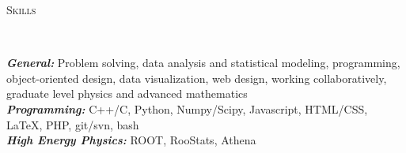 \documentclass[9pt]{article}
\newenvironment{changemargin}[2]{%
  \begin{list}{}{%
    \setlength{\topsep}{0pt}%
    \setlength{\leftmargin}{#1}%
    \setlength{\rightmargin}{#2}%
    \setlength{\listparindent}{\parindent}%
    \setlength{\itemindent}{\parindent}%
    \setlength{\parsep}{\parskip}%
  }%
  \item[]}{\end{list}
}
\newcommand{\lineover}{
	\begin{changemargin}{-0.05in}{-0.05in}
		\vspace*{-8pt}
		\hrulefill \\
		\vspace*{-2pt}
	\end{changemargin}
}
\newcommand{\header}[1]{
	\begin{changemargin}{-0.5in}{-0.5in}
		\scshape{#1}\\
  	\lineover
	\end{changemargin}
}
\newenvironment{body} {
	\vspace*{-16pt}
	\begin{changemargin}{-0.25in}{-0.5in}
  }	
	{\end{changemargin}
}
\begin{document}
\header{Skills}

\begin{body}
	\vspace{14pt}
        \emph{\textbf{General:}}{} Problem solving, data analysis and statistical modeling, programming, object-oriented design, data visualization, web design, working collaboratively, graduate level physics and advanced mathematics \\
        \smallskip
	\emph{\textbf{Programming:}}{} C++/C, Python, Numpy/Scipy, Javascript, HTML/CSS, \LaTeX, PHP, git/svn, bash \\
        \smallskip
	\emph{\textbf{High Energy Physics:}}{} ROOT, RooStats, Athena\\
\end{body}

\smallskip
\end{document}
